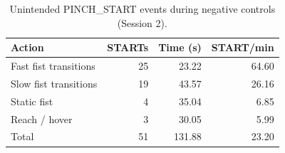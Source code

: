 \begin{table}[t]
\centering
\caption{Unintended PINCH\_START events during negative controls (Session 2).}
\label{tab:pinch-negatives}
\footnotesize
\setlength{\tabcolsep}{3pt}
\begin{tabular}{lrrr}
\hline
Action & STARTs & Time (s) & START/min \\
\hline
Fast fist transitions & 25 & 23.22 & 64.60 \\
Slow fist transitions & 19 & 43.57 & 26.16 \\
Static fist & 4 & 35.04 & 6.85 \\
Reach / hover & 3 & 30.05 & 5.99 \\
Total & 51 & 131.88 & 23.20 \\
\hline
\end{tabular}
\end{table}
